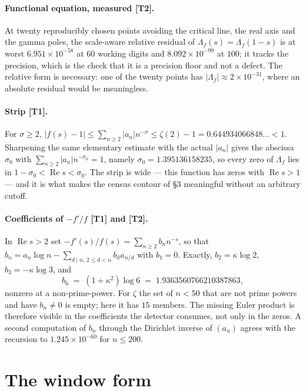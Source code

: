 \documentclass[11pt,a4paper]{article}
\theoremstyle{definition}
\theoremstyle{remark}
\newcommand{\tier}[1]{{\small\textsf{[#1]}}}
\begin{document}
\paragraph{Functional equation, measured \tier{T2}.} At twenty reproducibly chosen points
avoiding the critical line, the real axis and the gamma poles, the scale-aware relative
residual of $\Lambda_f(s) = \Lambda_f(1-s)$ is at worst $6.951\times10^{-58}$ at $60$
working digits and $8.092\times10^{-99}$ at $100$; it tracks the precision, which is the
check that it is a precision floor and not a defect. The relative form is necessary: one
of the twenty points has $|\Lambda_f| \approx 2\times10^{-31}$, where an absolute
residual would be meaningless.

\paragraph{Strip \tier{T1}.} For $\sigma \ge 2$,
$|f(s)-1| \le \sum_{n\ge2}|a_n|n^{-\sigma} \le \zeta(2)-1 = 0.644934066848\ldots < 1$.
Sharpening the same elementary estimate with the actual $|a_n|$ gives the abscissa
$\sigma_0$ with $\sum_{n\ge2}|a_n|n^{-\sigma_0} = 1$, namely
$\sigma_0 = 1.395136158235$, so every zero of $\Lambda_f$ lies in
$1-\sigma_0 < \operatorname{Re}s < \sigma_0$. The strip is wide --- this function has
zeros with $\operatorname{Re}s>1$ --- and it is what makes the census contour of \S3
meaningful without an arbitrary cutoff.

\paragraph{Coefficients of $-f'/f$ \tier{T1} and \tier{T2}.} In $\operatorname{Re}s>2$ set
$-f'(s)/f(s) = \sum_{n\ge2}b_nn^{-s}$, so that
$b_n = a_n\log n - \sum_{d\mid n,\,2\le d<n}b_d a_{n/d}$ with $b_1=0$. Exactly,
$b_2 = \kappa\log2$, $b_3 = -\kappa\log3$, and
\[
b_6 \;=\; (1+\kappa^2)\log 6 \;=\; 1.9363560766210387863,
\]
nonzero at a non-prime-power. For $\zeta$ the set of $n<50$ that are not prime powers and
have $b_n\ne0$ is empty; here it has $15$ members. The missing Euler product is therefore
visible in the coefficients the detector consumes, not only in the zeros. A second
computation of $b_n$ through the Dirichlet inverse of $(a_n)$ agrees with the recursion to
$1.245\times10^{-60}$ for $n\le200$.

\section{The window form}\label{sec:form}
\end{document}
